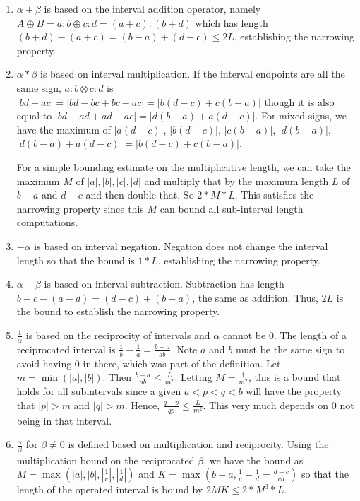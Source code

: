 \documentclass[12pt]{article}
\begin{document}
\begin{enumerate}
    \item $\alpha+\beta$ is based on the interval addition operator, namely $A \oplus B = a:b \oplus c:d = (a+c):(b+d)$ which has length $(b+d) - (a+c) = (b-a) + (d-c) \leq 2L$, establishing the narrowing property. 
    \item $\alpha * \beta$ is based on interval multiplication. If the interval endpoints are all the same sign, $a:b \otimes c:d$ is $|bd-ac| = |bd -bc + bc -ac| =  |b(d-c) + c(b-a)|$ though it is also equal to $|bd - ad + ad - ac| = |d(b-a) + a(d-c)|$. For mixed signs, we have the maximum of $|a(d-c)|$, $|b(d-c)|$, $|c(b-a)|$, $|d(b-a)|$, $|d(b-a)+a(d-c)| = |b(d-c) + c(b-a)|$. 
    
    For a simple bounding estimate on the multiplicative length, we can take the maximum $M$ of $|a|, |b|, |c|, |d|$ and multiply that by the maximum length $L$ of $b-a$ and $d-c$ and then double that. So $2*M*L$. This satisfies the narrowing property since this $M$ can bound all sub-interval length computations.
    \item $-\alpha$ is based on interval negation. Negation does not change the interval length so that the bound is $1*L$, establishing the narrowing property. 
    \item $\alpha - \beta$ is based on interval subtraction. Subtraction has length $b-c - (a-d) = (d-c) + (b-a)$, the same as addition. Thus, $2L$ is the bound to establish the narrowing property. 
    \item $\frac{1}{\alpha}$ is based on the reciprocity of intervals and $\alpha$ cannot be $0$. The length of a reciprocated interval is $\frac{1}{b} - \frac{1}{a} = \tfrac{b-a}{ab}$. Note $a$ and $b$ must be the same sign to avoid having 0 in there, which was part of the definition. Let $m = \min(|a|, |b|)$. Then $\tfrac{b-a}{ab} \leq \tfrac{L}{m^2}$. Letting $M = \tfrac{1}{m^2}$, this is a bound that holds for all subintervals since a given $a < p < q < b$ will have the property that $|p| > m$ and $|q| > m$. Hence, $\frac{q-p}{qp} \leq \frac{L}{m^2}$. This very much depends on $0$ not being in that interval. 
    \item $\tfrac{\alpha}{\beta}$ for $\beta \neq 0$ is defined based on multiplication and reciprocity. Using the multiplication bound on the reciprocated $\beta$, we have the bound as $M = \max(|a|, |b|, |\frac{1}{c}|, |\frac{1}{d}|)$ and $K= \max(b-a, \frac{1}{c} - \frac{1}{d}= \tfrac{d-c}{cd} )$ so that the length of the operated interval is bound by $2MK \leq 2*M^3*L$.

\end{enumerate}
\end{document}
